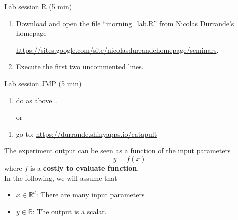 \documentclass{beamer}
\begin{document}
\begin{frame}{}
\begin{exampleblock}{Lab session R (5 min)}
	\begin{enumerate}
		\item Download and open the file ``morning\_lab.R'' from Nicolas Durrande's homepage
		\begin{center}
			{\scriptsize \url{https://sites.google.com/site/nicolasdurrandehomepage/seminars}}.
		\end{center} 
		
		\item Execute the first two uncommented lines. %
	\end{enumerate}
\end{exampleblock}
\bigskip
\begin{exampleblock}{Lab session JMP (5 min)}
	\begin{enumerate}
		\item do as above... 
	\end{enumerate}
	\begin{itemize}
		\item[or]
	\end{itemize}
	\begin{enumerate}
		\item go to: \url{https://durrande.shinyapps.io/catapult} 
	\end{enumerate}
\end{exampleblock}

\end{frame}

\begin{frame}{}
The experiment output can be seen as a function of the input parameters
$$ y = f(x). $$
where $f$ is a \textbf{costly to evaluate function}. \\
\vspace{5mm}
In the following, we will assume that 
\begin{itemize}
	\item $x \in \mathds{R}^d$: There are many input parameters
	\item $y \in \mathds{R}$: The output is a scalar.
\end{itemize}
\end{frame}
\end{document}
